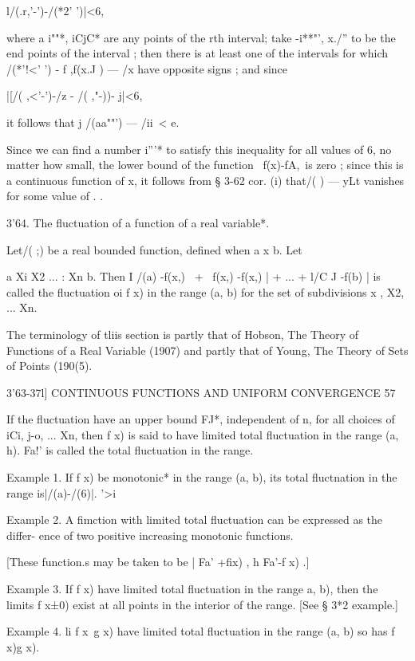 l/(.r,'-')-/(*2' ')|<6, 

where a i""*, iCjC* are any points of the rth interval; take  -i**"', x./'' to be 
the end points of the interval ; then there is at least one of the intervals 
for which /(*'!<' ') - f ,f(x.J ) — /x have opposite signs ; and since 

|[/( ,<'-')-/z - /( ,"-))- j|<6, 

it follows that j /(aa""') — /ii\ <  e. 

Since we can find a number  i'''* to satisfy this inequality for all values 
of 6, no matter how small, the lower bound of the function \ f(x)-fA,\ is 
zero ; since this is a continuous function of x, it follows from § 3-62 cor. (i) 
that/( ) — yLt vanishes for some value of . . 

3'64. The fluctuation of a function of a real variable*. 

Let/( ;) be a real bounded function, defined when a x b. Let 

a Xi X2  ... : Xn b. 
Then I /(a) -f(x,) \ + \ f(x,) -f(x,) | + ... + l/C J -f(b) | is called the 
fluctuation oi f x) in the range (a, b) for the set of subdivisions x , X2, ... Xn. 

The terminology of tliis section is partly that of Hobson, The Theory of Functions of a Real 
Variable (1907) and partly that of Young, The Theory of Sets of Points (190(5). 



3'63-37l] CONTINUOUS FUNCTIONS AND UNIFORM CONVERGENCE 57 

If the fluctuation have an upper bound FJ*, independent of n, for all choices of 
iCi, j-o, ... Xn, then f x) is said to have limited total fluctuation in the range 
(a, h). Fa!' is called the total fluctuation in the range. 

Example 1. If f x) be monotonic* in the range (a, b), its total fluctnation in the range 
is|/(a)-/(6)|. '>i    

Example 2. A fimction with limited total fluctuation can be expressed as the differ- 
ence of two positive increasing monotonic functions. 

[These function.s may be taken to be |  Fa' +fix) , h  Fa'-f x) .] 

Example 3. If f x) have limited total fluctuation in the range  a, b), then the limits 
f x±0) exist at all points in the interior of the range. [See § 3*2 example.] 

Example 4. li f x\ g x) have limited total fluctuation in the range (a, b) so has 
f x)g x). 

